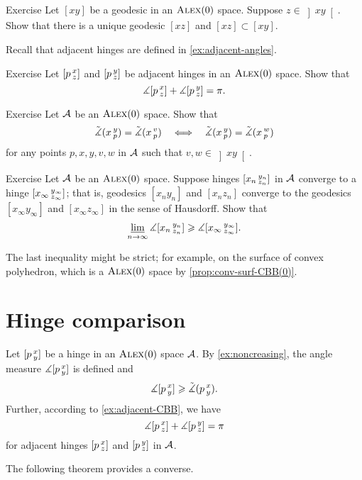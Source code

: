 \begin{thm}{Exercise}\label{ex:pi-angle}
Let $[xy]$ be a geodesic in an $\textsc{Alex}(0)$ space.
Suppose $z\in \left]xy\right[$. Show that there is a unique geodesic $[xz]$ and $[xz]\subset [xy]$.
\end{thm}

Recall that adjacent hinges are defined in \ref{ex:adjacent-angles}.

\begin{thm}{Exercise}\label{ex:adjacent-CBB}
Let $[p\,{}^{x}_{z}]$ and $[p\,{}^{y}_{z}]$ be adjacent hinges in an $\textsc{Alex}(0)$ 
space.
Show that
\[\measuredangle[p\,{}^{x}_{z}]+\measuredangle[p\,{}^{y}_{z}]= \pi.\]
\end{thm}


\begin{thm}{Exercise}\label{ex:pxyvw}
Let $\mathcal{A}$ be an $\textsc{Alex}(0)$ 
space.
Show that  
\[
\tilde\measuredangle(x\,{}^{y}_{p})=\tilde\measuredangle(x\,{}^{v}_{p})
\quad\Longleftrightarrow\quad
\tilde\measuredangle(x\,{}^{y}_{p})=\tilde\measuredangle(x\,{}^{w}_{p})
\]
for any points
$p,x,y,v,w$ in $\mathcal{A}$ such that $v,w\in \left]xy\right[$.
\end{thm}

\begin{thm}{Exercise}\label{ex:angle-lim}
Let $\mathcal{A}$ be an $\textsc{Alex}(0)$ space.
Suppose hinges $[x_n\,{}^{y_n}_{z_n}]$ in $\mathcal{A}$ converge to a hinge $[x_\infty\,{}^{y_\infty}_{z_\infty}]$;
that is, geodesics $[x_ny_n]$ and $[x_nz_n]$ converge to the geodesics $[x_\infty y_\infty]$ and $[x_\infty z_\infty]$ in the sense of Hausdorff.
Show that 
\[\varliminf_{n\to\infty}\measuredangle [x_n\,{}^{y_n}_{z_n}]\geqslant \measuredangle [x_\infty\,{}^{y_\infty}_{z_\infty}].\]
\end{thm}

The last inequality might be strict;
for example, on the surface of convex polyhedron, which is a $\textsc{Alex}(0)$ space by \ref{prop:conv-surf-CBB(0)}.

\section{Hinge comparison}

Let $[p\,{}^{x}_{y}]$ be a hinge in an $\textsc{Alex}(0)$ space $\mathcal{A}$.
By \ref{ex:noncreasing}, the angle measure $\measuredangle[p\,{}^{x}_{y}]$ is defined and
\[\measuredangle[p\,{}^{x}_{y}]\geqslant \tilde\measuredangle(p\,{}^{x}_{y}).\]
Further, according to \ref{ex:adjacent-CBB}, we have 
\[\measuredangle[p\,{}^{x}_{z}]+\measuredangle[p\,{}^{y}_{z}]=\pi\]
for adjacent hinges $[p\,{}^{x}_{z}]$ and $[p\,{}^{y}_{z}]$ in $\mathcal{A}$.

The following theorem provides a converse.

